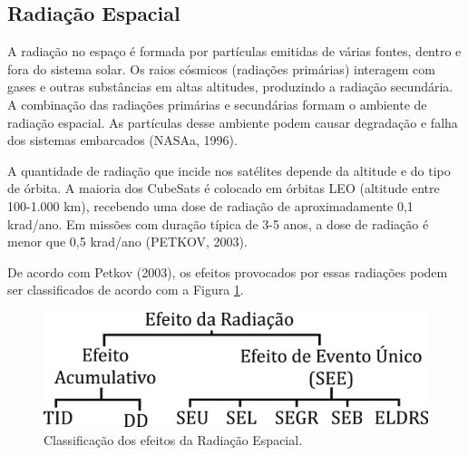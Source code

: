\subsection{Radiação Espacial}

A radiação no espaço é formada por partículas emitidas de várias fontes, dentro e fora do sistema solar. Os raios cósmicos (radiações primárias) interagem com gases e outras substâncias em altas altitudes, produzindo a radiação secundária. A combinação das radiações primárias e secundárias formam o ambiente de radiação espacial. As partículas desse ambiente podem causar degradação e falha dos sistemas embarcados (NASAa, 1996).

A quantidade de radiação que incide nos satélites depende da altitude e do tipo de órbita. A maioria dos CubeSats é colocado em órbitas LEO (altitude entre 100-1.000 km), recebendo uma dose de radiação de aproximadamente 0,1 krad/ano. Em missões com duração típica de 3-5 anos, a dose de radiação é menor que 0,5 krad/ano  (PETKOV, 2003).

De acordo com Petkov (2003), os efeitos provocados por essas radiações podem ser classificados de acordo com a Figura \ref{fig17}.

\begin{figure}[h]
	\centering
	\includegraphics[keepaspectratio=true,scale=0.55]{figuras/radiation.jpg}
	\caption{Classificação dos efeitos da Radiação Espacial.}
	\label{fig17}
\end{figure}

